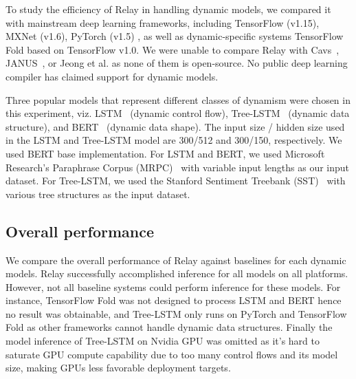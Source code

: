 To study the efficiency of Relay in handling dynamic models, we compared it with mainstream deep learning frameworks, including TensorFlow (v1.15), MXNet (v1.6), PyTorch (v1.5) \footnotemark, as well as dynamic-specific systems TensorFlow Fold based on TensorFlow v1.0.
We were unable to compare Relay with Cavs~\citep{xu2018cavs}, JANUS~\citep{jeong2019janus}, or Jeong et al.\citep{jeong2018improving} as none of them is open-source. No public deep learning compiler has claimed support for dynamic models.

Three popular models that represent different classes of dynamism were chosen in this experiment, viz. LSTM~\citep{lstm} (dynamic control flow), Tree-LSTM~\citep{tree_lstm} (dynamic data structure), and BERT~\citep{devlin2018bert} (dynamic data shape).
The input size / hidden size used in the LSTM and Tree-LSTM model are 300/512 and 300/150, respectively.
We used BERT base implementation.
For LSTM and BERT, we used Microsoft Research's Paraphrase Corpus (MRPC)~\citep{dolan2005microsoft} with variable input lengths as our input dataset. For Tree-LSTM, we used the Stanford Sentiment Treebank (SST)~\citep{socher2013recursive} with various tree structures as the input dataset.

\subsection{Overall performance}
\label{sec:eval:overall}
We compare the overall performance of Relay against baselines for each dynamic models. Relay successfully accomplished inference for all models on all platforms. However, not all baseline systems could perform inference for these models. For instance, TensorFlow Fold was not designed to process LSTM and BERT hence no result was obtainable, and Tree-LSTM only runs on PyTorch and TensorFlow Fold as other frameworks cannot handle dynamic data structures. Finally the model inference of Tree-LSTM on Nvidia GPU was omitted as it's hard to saturate GPU compute capability due to too many control flows and its model size, making GPUs less favorable deployment targets.

